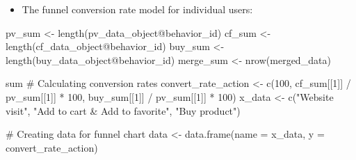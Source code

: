 \documentclass[
  11pt,
]{article}
\newenvironment{Shaded}{\begin{snugshade}}{\end{snugshade}}
\newcommand{\AttributeTok}[1]{\textcolor[rgb]{0.40,0.45,0.13}{#1}}
\newcommand{\CommentTok}[1]{\textcolor[rgb]{0.37,0.37,0.37}{#1}}
\newcommand{\DecValTok}[1]{\textcolor[rgb]{0.68,0.00,0.00}{#1}}
\newcommand{\FunctionTok}[1]{\textcolor[rgb]{0.28,0.35,0.67}{#1}}
\newcommand{\NormalTok}[1]{\textcolor[rgb]{0.00,0.23,0.31}{#1}}
\newcommand{\OtherTok}[1]{\textcolor[rgb]{0.00,0.23,0.31}{#1}}
\newcommand{\SpecialCharTok}[1]{\textcolor[rgb]{0.37,0.37,0.37}{#1}}
\newcommand{\StringTok}[1]{\textcolor[rgb]{0.13,0.47,0.30}{#1}}
\providecommand{\tightlist}{%
  \setlength{\itemsep}{0pt}\setlength{\parskip}{0pt}}\usepackage{longtable,booktabs,array}
\begin{document}
\begin{itemize}
\tightlist
\item
  The funnel conversion rate model for individual users:
\end{itemize}

\begin{Shaded}
\begin{Highlighting}[]
\NormalTok{pv\_sum  }\OtherTok{\textless{}{-}} \FunctionTok{length}\NormalTok{(pv\_data\_object}\SpecialCharTok{@}\NormalTok{behavior\_id)}
\NormalTok{cf\_sum  }\OtherTok{\textless{}{-}} \FunctionTok{length}\NormalTok{(cf\_data\_object}\SpecialCharTok{@}\NormalTok{behavior\_id)}
\NormalTok{buy\_sum  }\OtherTok{\textless{}{-}} \FunctionTok{length}\NormalTok{(buy\_data\_object}\SpecialCharTok{@}\NormalTok{behavior\_id)}
\NormalTok{merge\_sum }\OtherTok{\textless{}{-}} \FunctionTok{nrow}\NormalTok{(merged\_data)}

\NormalTok{sum}
\CommentTok{\# Calculating conversion rates}
\NormalTok{convert\_rate\_action }\OtherTok{\textless{}{-}} \FunctionTok{c}\NormalTok{(}\DecValTok{100}\NormalTok{,}
\NormalTok{                         cf\_sum[[}\DecValTok{1}\NormalTok{]] }\SpecialCharTok{/}\NormalTok{ pv\_sum[[}\DecValTok{1}\NormalTok{]] }\SpecialCharTok{*} \DecValTok{100}\NormalTok{,}
\NormalTok{                         buy\_sum[[}\DecValTok{1}\NormalTok{]] }\SpecialCharTok{/}\NormalTok{ pv\_sum[[}\DecValTok{1}\NormalTok{]] }\SpecialCharTok{*} \DecValTok{100}\NormalTok{)}
\NormalTok{x\_data }\OtherTok{\textless{}{-}} \FunctionTok{c}\NormalTok{(}\StringTok{"Website visit"}\NormalTok{, }\StringTok{"Add to cart \& Add to favorite"}\NormalTok{, }\StringTok{"Buy product"}\NormalTok{)}

\CommentTok{\# Creating data for funnel chart}
\NormalTok{data }\OtherTok{\textless{}{-}} \FunctionTok{data.frame}\NormalTok{(}\AttributeTok{name =}\NormalTok{ x\_data, }\AttributeTok{y =}\NormalTok{ convert\_rate\_action)}


\end{Highlighting}
\end{Shaded}
\end{document}
